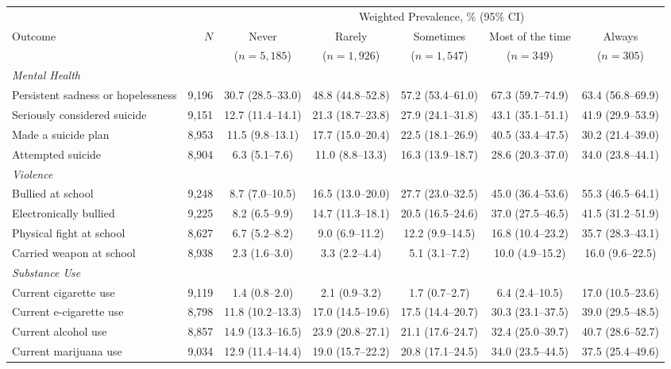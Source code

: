 \documentclass[12pt]{article}
\begin{document}
\begin{landscape}
\begin{table}[p]
\begin{tabular}{l r ccccc}
\toprule
 & & \multicolumn{5}{c}{Weighted Prevalence, \% (95\% CI)} \\
\cmidrule(lr){3-7}
Outcome & $N$ & Never & Rarely & Sometimes & Most of the time & Always \\
 & & ($n = 5,185$) & ($n = 1,926$) & ($n = 1,547$) & ($n = 349$) & ($n = 305$) \\
\midrule
\textit{Mental Health} \\
\quad Persistent sadness or hopelessness & 9,196 & 30.7 (28.5--33.0) & 48.8 (44.8--52.8) & 57.2 (53.4--61.0) & 67.3 (59.7--74.9) & 63.4 (56.8--69.9) \\
\quad Seriously considered suicide & 9,151 & 12.7 (11.4--14.1) & 21.3 (18.7--23.8) & 27.9 (24.1--31.8) & 43.1 (35.1--51.1) & 41.9 (29.9--53.9) \\
\quad Made a suicide plan & 8,953 & 11.5 (9.8--13.1) & 17.7 (15.0--20.4) & 22.5 (18.1--26.9) & 40.5 (33.4--47.5) & 30.2 (21.4--39.0) \\
\quad Attempted suicide & 8,904 & 6.3 (5.1--7.6) & 11.0 (8.8--13.3) & 16.3 (13.9--18.7) & 28.6 (20.3--37.0) & 34.0 (23.8--44.1) \\
\addlinespace[4pt]
\textit{Violence} \\
\quad Bullied at school & 9,248 & 8.7 (7.0--10.5) & 16.5 (13.0--20.0) & 27.7 (23.0--32.5) & 45.0 (36.4--53.6) & 55.3 (46.5--64.1) \\
\quad Electronically bullied & 9,225 & 8.2 (6.5--9.9) & 14.7 (11.3--18.1) & 20.5 (16.5--24.6) & 37.0 (27.5--46.5) & 41.5 (31.2--51.9) \\
\quad Physical fight at school & 8,627 & 6.7 (5.2--8.2) & 9.0 (6.9--11.2) & 12.2 (9.9--14.5) & 16.8 (10.4--23.2) & 35.7 (28.3--43.1) \\
\quad Carried weapon at school & 8,938 & 2.3 (1.6--3.0) & 3.3 (2.2--4.4) & 5.1 (3.1--7.2) & 10.0 (4.9--15.2) & 16.0 (9.6--22.5) \\
\addlinespace[4pt]
\textit{Substance Use} \\
\quad Current cigarette use & 9,119 & 1.4 (0.8--2.0) & 2.1 (0.9--3.2) & 1.7 (0.7--2.7) & 6.4 (2.4--10.5) & 17.0 (10.5--23.6) \\
\quad Current e-cigarette use & 8,798 & 11.8 (10.2--13.3) & 17.0 (14.5--19.6) & 17.5 (14.4--20.7) & 30.3 (23.1--37.5) & 39.0 (29.5--48.5) \\
\quad Current alcohol use & 8,857 & 14.9 (13.3--16.5) & 23.9 (20.8--27.1) & 21.1 (17.6--24.7) & 32.4 (25.0--39.7) & 40.7 (28.6--52.7) \\
\quad Current marijuana use & 9,034 & 12.9 (11.4--14.4) & 19.0 (15.7--22.2) & 20.8 (17.1--24.5) & 34.0 (23.5--44.5) & 37.5 (25.4--49.6) \\
\bottomrule
\end{tabular}


\end{table}
\end{landscape}
\end{document}
